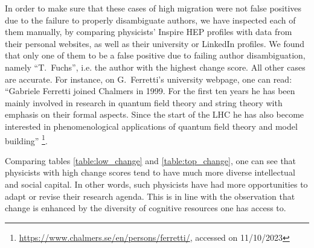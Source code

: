\documentclass{article}
\begin{document}
In order to make sure that these cases of high migration were not false positives due to the failure to properly disambiguate authors, we have inspected each of them manually, by comparing physicists' Inspire HEP profiles with data from their personal websites, as well as their university or LinkedIn profiles. We found that only one of them to be a false positive due to failing author disambiguation, namely ``T.~Fuchs'', i.e. the author with the highest change score. All other cases are accurate.
For instance, on G.~Ferretti's university webpage, one can read: ``Gabriele Ferretti joined Chalmers in 1999. For the first ten years he has been mainly involved in research in quantum field theory and string theory with emphasis on their formal aspects. Since the start of the LHC he has also become interested in phenomenological applications of quantum field theory and model building'' \footnote{\url{https://www.chalmers.se/en/persons/ferretti/}, accessed on 11/10/2023}.

Comparing tables \ref{table:low_change} and \ref{table:top_change}, one can see that physicists with high change scores tend to have much more diverse intellectual and social capital. In other words, such physicists have had more opportunities to adapt or revise their research agenda. This is in line with the observation that change is enhanced by the diversity of cognitive resources one has access to.
\end{document}
